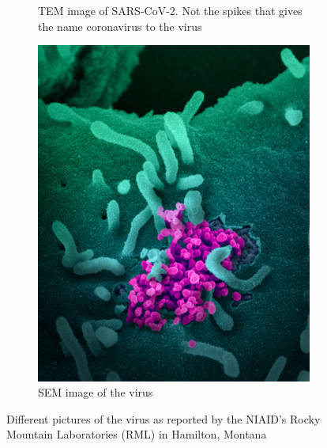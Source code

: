 \documentclass[
12pt, %
a4paper, %
oneside, %
headinclude,footinclude, %
BCOR5mm, %
]{scrartcl}
\begin{document}
\begin{figure}[ht]
\begin{subfigure}{.5\textwidth}
  \caption{TEM image of SARS-CoV-2. Not the spikes that gives the name coronavirus to the virus }
  \label{fig:sub-second}
\end{subfigure}
\begin{subfigure}{.5\textwidth}
  \centering
  \includegraphics[width=.7\linewidth]{Figures/Coronavirus4.jpg} 
  \caption{SEM image of the virus}
  \label{fig:sub-second}
\end{subfigure}
\caption{Different pictures of the virus as reported by the NIAID’s Rocky Mountain Laboratories (RML) in Hamilton, Montana \cite{coronavirus+pictures}  }
\label{coronavirus_picture}
\end{figure}
\end{document}
